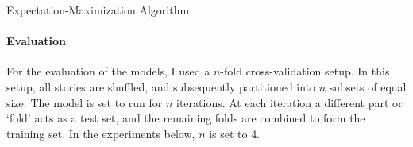 \begin{algorithm}[t]
 \caption{Expectation-Maximization Algorithm}
 \label{alg:expectation-maximization}
\end{algorithm}

\paragraph{Evaluation}

For the evaluation of the models, I used a $n$-fold cross-validation setup. In this setup, all stories are shuffled, and subsequently partitioned into $n$ subsets of equal size. The model is set to run for $n$ iterations. At each iteration a different part or `fold' acts as a test set, and the remaining folds are combined to form the training set. In the experiments below, $n$ is set to 4.

